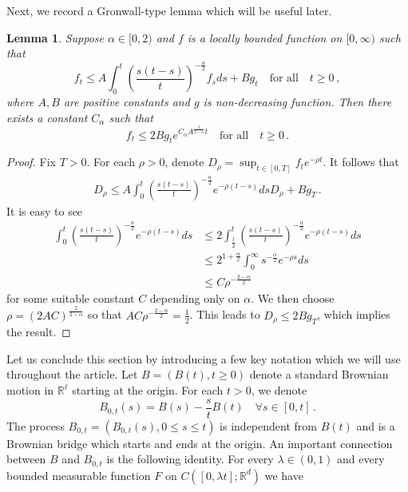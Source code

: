 \documentclass[12pt,reqno]{amsart}
\newtheorem{lemma}[theorem]{Lemma}
\theoremstyle{remark}
\newcommand{\1}{\mathbf{1}}
\def\RR{\mathbb{R}}
\def\lt{\left}
\def\rt{\right}
\begin{document}
	Next, we record a Gronwall-type lemma which will be useful later.
	\begin{lemma}\label{lem:gronwall}
		Suppose $\alpha\in[0,2)$ and $f$ is a locally bounded function on $[0,\infty)$ such that
		\begin{equation*}
			f_t\le A\int_0^t\lt(\frac{s(t-s)}t \rt)^{-\frac \alpha2}f_s ds+Bg_t \quad\mbox{for all}\quad t\ge0 \,,
		\end{equation*}
		where $A,B$ are positive constants and $g$ is non-decreasing function. Then there exists a constant $C_ \alpha$ such that
		\begin{equation*}
			f_t\le 2Bg_t e^{C_ \alpha A^{\frac2{2- \alpha}}t} \quad\mbox{for all}\quad t\ge0\,.
		\end{equation*}
	\end{lemma}
	\begin{proof}
		Fix $T>0$. For each $\rho>0$, denote $D_ \rho=\sup_{t\in[0,T]}f_t e^{-\rho t}$. It follows that
		\begin{align*}
			D_ \rho\le A\int_0^t\lt(\frac{s(t-s)}t \rt)^{-\frac \alpha2} e^{-\rho(t-s)}ds D_ \rho+Bg_T\,.
		\end{align*}
		It is easy to see
		\begin{align*}
			\int_0^t\lt(\frac{s(t-s)}t \rt)^{-\frac \alpha2} e^{-\rho(t-s)}ds
			&\le 2\int_{\frac t2}^t\lt(\frac{s(t-s)}t \rt)^{-\frac \alpha2} e^{-\rho (t-s)}ds
			\\&\le 2^{1+\frac \alpha2}\int_0^\infty s^{-\frac \alpha2}e^{-\rho s}ds
			\\&\le C \rho^{-\frac {2-\alpha}2}
		\end{align*}
		for some suitable constant $C$ depending only on $\alpha$. We then choose $\rho=(2AC)^{\frac2{2- \alpha}} $ so that $AC\rho^{-\frac{2- \alpha}2}=\frac12$. This leads to $D_ \rho\le 2Bg_T$, which implies the result.
	\end{proof}
	Let us conclude this section by introducing a few key notation which we will use throughout the article.
	Let $B=(B(t),t\ge0)$ denote a standard Brownian motion in $\RR^\ell$ starting at the origin. For each $t>0$, we denote
	\begin{equation}\label{def:Bbridge}
		B_{0,t}(s)=B(s)-\frac st B(t)\quad\forall s\in[0,t]\,.
	\end{equation}
	The process $B_{0,t}=(B_{0,t}(s),0\le s\le t)$ is independent from $B(t)$ and is a Brownian bridge which starts and ends at the origin.
	An important connection between $B$ and $B_{0,t}$ is the following identity. For every $\lambda\in(0,1)$ and every bounded measurable function $F$ on $C([0,\lambda t];\RR^d) $ we have
\end{document}

